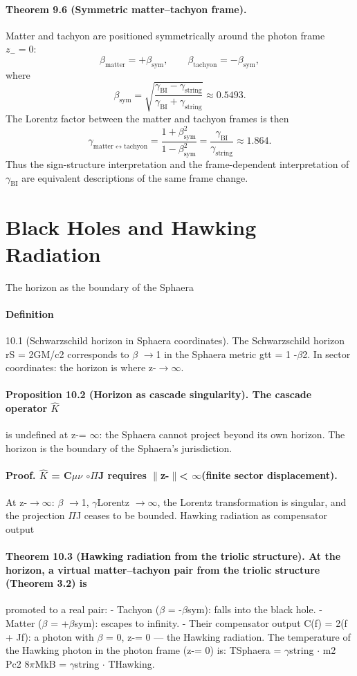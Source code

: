 \documentclass[12pt,a4paper]{article}
\begin{document}
\paragraph*{Theorem 9.6 (Symmetric matter--tachyon frame).}
Matter and tachyon are positioned symmetrically around the photon frame $z_-=0$:
\[
\beta_{\mathrm{matter}} = +\beta_{\mathrm{sym}}, \qquad \beta_{\mathrm{tachyon}} = -\beta_{\mathrm{sym}},
\]
where
\[
\beta_{\mathrm{sym}} = \sqrt{\frac{\gamma_{\mathrm{BI}}-\gamma_{\mathrm{string}}}{\gamma_{\mathrm{BI}}+\gamma_{\mathrm{string}}}} \approx 0.5493.
\]
The Lorentz factor between the matter and tachyon frames is then
\[
\gamma_{\mathrm{matter}\leftrightarrow\mathrm{tachyon}} = \frac{1+\beta_{\mathrm{sym}}^2}{1-\beta_{\mathrm{sym}}^2} = \frac{\gamma_{\mathrm{BI}}}{\gamma_{\mathrm{string}}} \approx 1.864.
\]
Thus the sign-structure interpretation and the frame-dependent interpretation of $\gamma_{\mathrm{BI}}$ are equivalent descriptions of the same frame change.


\section{Black Holes and Hawking Radiation}
The horizon as the boundary of the Sphaera
\paragraph*{Definition}
10.1
(Schwarzschild horizon in Sphaera coordinates). The Schwarzschild horizon rS = 2GM/c2 corresponds to $\beta$ $\to$1 in the Sphaera metric gtt = 1 -$\beta$2. In sector coordinates: the horizon is where z-$\to$$\infty$.
\paragraph*{Proposition 10.2 (Horizon as cascade singularity). The cascade operator $\hat K$}
is undefined at z-= $\infty$: the Sphaera cannot project beyond its own horizon. The horizon is the boundary of the Sphaera's jurisdiction.
\paragraph*{Proof. $\hat K$ = C$\mu$$\nu$ $\circ$$\Pi$J requires $\|$z-$\|$< $\infty$(finite sector displacement).}
At z-$\to$$\infty$: $\beta$ $\to$1, $\gamma$Lorentz $\to$$\infty$, the Lorentz transformation is singular, and the projection $\Pi$J ceases to be bounded. Hawking radiation as compensator output
\paragraph*{Theorem 10.3 (Hawking radiation from the triolic structure). At the horizon, a virtual matter--tachyon pair from the triolic structure (Theorem 3.2) is}
promoted to a real pair:
- Tachyon ($\beta$ = -$\beta$sym): falls into the black hole.
- Matter ($\beta$ = +$\beta$sym): escapes to infinity.
- Their compensator output C(f) =
2(f + Jf): a photon with $\beta$ = 0, z-= 0 --- the Hawking radiation. The temperature of the Hawking photon in the photon frame (z-= 0) is: TSphaera = $\gamma$string $\cdot$ m2 Pc2 8$\pi$MkB = $\gamma$string $\cdot$ THawking.
\end{document}
